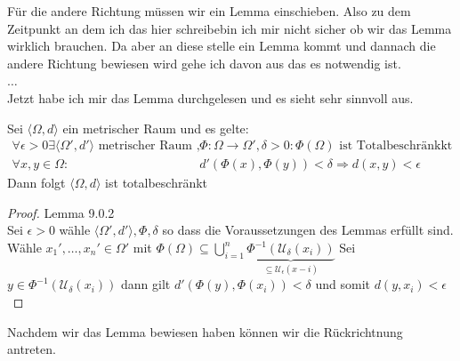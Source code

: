 Für die andere Richtung müssen wir ein Lemma einschieben. Also zu dem Zeitpunkt
an dem ich das hier schreibebin ich mir nicht sicher ob wir das Lemma wirklich brauchen. 
Da aber an diese stelle ein Lemma kommt und dannach die andere Richtung bewiesen wird
gehe ich davon aus das es notwendig ist. \\
$\dots$\\
Jetzt habe ich mir das Lemma durchgelesen und es sieht sehr sinnvoll aus.

\mlenma{}
{
    Sei $\langle\Omega, d\rangle$ ein metrischer Raum und es gelte:
    \begin{equation*}
    \begin{split}
        \forall \epsilon > 0 \exists \langle \Omega', d' \rangle \text{ metrischer Raum },
        &\Phi : \Omega \to \Omega',
        \delta>0: \Phi(\Omega) \text{ ist Totalbeschränkkt }\\
        \forall x,y \in \Omega: &d'(\Phi(x),\Phi(y)) < \delta 
        \Rightarrow d(x,y)< \epsilon
    \end{split}
    \end{equation*}
    Dann folgt $\langle \Omega, d \rangle$ ist totalbeschränkt
}
     
\begin{proof}{Lemma 9.0.2}\\
    Sei $\epsilon > 0$ wähle $\langle \Omega', d' \rangle, \Phi, \delta$ so dass
    die Voraussetzungen des Lemmas erfüllt sind.
    Wähle $x_1', \ldots, x_n' \in \Omega'$ mit
    $\Phi(\Omega) \subseteq \bigcup_{i=1}^{n} 
    \underbrace{\Phi^{-1} (\mathcal{U}_{\delta}(x_i))}_{\subseteq \mathcal{U}_{\epsilon}(x-i)}$
    Sei $y \in \Phi^{-1}(\mathcal{U}_{\delta}(x_i))$
    dann gilt $d'(\Phi(y), \Phi(x_i)) < \delta$ und somit $d(y,x_i) < \epsilon$
    
\end{proof}
Nachdem wir das Lemma bewiesen haben können wir die Rückrichtnung antreten.

